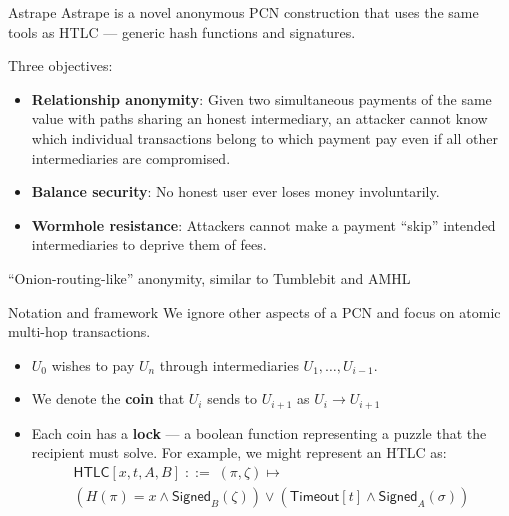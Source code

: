 \documentclass[aspectratio=169]{beamer}
\begin{document}
\begin{frame}{Astrape}
    Astrape is a novel anonymous PCN construction that uses the same tools as HTLC --- generic hash functions and signatures.

    Three objectives:
    \begin{itemize}
        \item \textbf{Relationship anonymity}: Given two simultaneous payments of the same value with paths sharing an honest intermediary, an attacker cannot know which individual transactions belong to which payment pay even if all other intermediaries are compromised.
        \item \textbf{Balance security}: No honest user ever loses money involuntarily.
        \item \textbf{Wormhole resistance}: Attackers cannot make a payment ``skip'' intended intermediaries to deprive them of fees.
    \end{itemize}

    ``Onion-routing-like'' anonymity, similar to Tumblebit and AMHL
\end{frame}

\begin{frame}{Notation and framework}
    We ignore other aspects of a PCN and focus on atomic multi-hop transactions.
    \begin{itemize}
        \item $U_0$ wishes to pay $U_n$ through intermediaries $U_1,\dots,U_{i-1}$.
        \item We denote the \textbf{coin} that $U_i$ sends to $U_{i+1}$ as $U_i \rightarrow U_{i+1}$
        \item Each coin has a \textbf{lock} --- a boolean function representing a puzzle that the recipient must solve. For example, we might represent an HTLC as:
              \begin{multline*}
                  \mathsf{HTLC}[x,t,A,B] \; ::= \; (\pi,\zeta) \mapsto \\
                  (H(\pi)=x \land \mathsf{Signed}_B(\zeta)) \lor
                  (\mathsf{Timeout}[t]\land\mathsf{Signed}_A(\sigma))
              \end{multline*}
    \end{itemize}
\end{frame}
\end{document}
